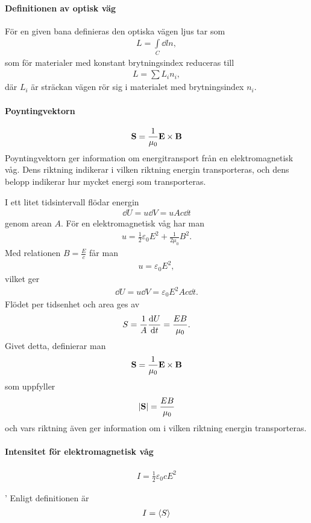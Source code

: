 \paragraph{Definitionen av optisk väg}
För en given bana definieras den optiska vägen ljus tar som
\begin{align*}
	L = \int\limits_{C}\dd{l}n,
\end{align*}
som för materialer med konstant brytningsindex reduceras till
\begin{align*}
	L = \sum L_in_i,
\end{align*}
där $L_i$ är sträckan vägen rör sig i materialet med brytningsindex $n_i$.

\paragraph{Poyntingvektorn}
\begin{align*}
	\vect{S} = \frac{1}{\mu_0}\vect{E}\times\vect{B}
\end{align*}
Poyntingvektorn ger information om energitransport från en elektromagnetisk våg. Dens riktning indikerar i vilken riktning energin transporteras, och dens belopp indikerar hur mycket energi som transporteras.

\deriv
I ett litet tidsintervall flödar energin
\begin{align*}
	\dd{U} = u\dd{V} = uAc\dd{t}
\end{align*}
genom arean $A$. För en elektromagnetisk våg har man
\begin{align*}
	u = \frac{1}{2}\varepsilon_0E^2 + \frac{1}{2\mu_0}B^2.
\end{align*}
Med relationen $B = \frac{E}{c}$ får man
\begin{align*}
	u = \varepsilon_0E^2,
\end{align*}
vilket ger
\begin{align*}
	\dd{U} = u\dd{V} = \varepsilon_0E^2Ac\dd{t}.
\end{align*}
Flödet per tidsenhet och area ges av
\begin{align*}
	S = \frac{1}{A}\dv{U}{t} = \frac{EB}{\mu_0}.
\end{align*}
Givet detta, definierar man
\begin{align*}
	\vect{S} = \frac{1}{\mu_0}\vect{E}\times\vect{B}
\end{align*}
som uppfyller
\begin{align*}
	\abs{\vect{S}} = \frac{EB}{\mu_0}
\end{align*}
och vars riktning även ger information om i vilken riktning energin transporteras.

\paragraph{Intensitet för elektromagnetisk våg}
\begin{align*}
	I = \frac{1}{2}\varepsilon_0cE^2
\end{align*}

\deriv'
Enligt definitionen är
\begin{align*}
	I = \expval{S}
\end{align*}